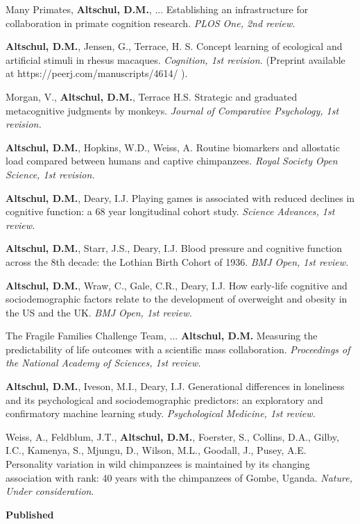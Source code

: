\documentclass[margin,line]{res}
\begin{document}
\begin{resume}
Many Primates, {\bf Altschul, D.M.}, ... Establishing an infrastructure for collaboration in primate cognition research. {\it PLOS One, 2nd review.}

{\bf Altschul, D.M.}, Jensen, G.,  Terrace, H. S. Concept learning of ecological and artificial stimuli in rhesus macaques. {\it Cognition, 1st revision.} (Preprint available at https://peerj.com/manuscripts/4614/ ).

Morgan, V., {\bf Altschul, D.M.}, Terrace H.S. Strategic and graduated metacognitive judgments by monkeys.  {\it Journal of Comparative Psychology, 1st revision.}

{\bf Altschul, D.M.}, Hopkins, W.D., Weiss, A. Routine biomarkers and allostatic load compared between humans and captive chimpanzees. {\it  Royal Society Open Science, 1st revision.}

{\bf Altschul, D.M.}, Deary, I.J. Playing games is associated with reduced declines in cognitive function: a 68 year longitudinal cohort study. {\it Science Advances, 1st review.}

{\bf Altschul, D.M.}, Starr, J.S., Deary, I.J. Blood pressure and cognitive function across the 8th decade: the Lothian Birth Cohort of 1936. {\it BMJ Open, 1st review.}

{\bf Altschul, D.M.}, Wraw, C., Gale, C.R., Deary, I.J. How early-life cognitive and sociodemographic factors relate to the development of overweight and obesity in the US and the UK. {\it BMJ Open, 1st review.}

The Fragile Families Challenge Team, ... {\bf Altschul, D.M.} Measuring the predictability of life outcomes with a scientific mass collaboration. {\it Proceedings of the National Academy of Sciences, 1st review.}

{\bf Altschul, D.M.}, Iveson, M.I., Deary, I.J. Generational differences in loneliness and its psychological and sociodemographic predictors: an exploratory and confirmatory machine learning study. {\it Psychological Medicine, 1st review.}

Weiss, A., Feldblum, J.T., {\bf Altschul, D.M.}, Foerster, S., Collins, D.A., Gilby, I.C., Kamenya, S., Mjungu, D., Wilson, M.L., Goodall, J., Pusey, A.E. Personality variation in wild chimpanzees is maintained by its changing association with rank: 40 years with the chimpanzees of Gombe, Uganda. {\it Nature, Under consideration}.


\vspace{0.2cm}

{\bf Published}


\end{resume}
\end{document}
